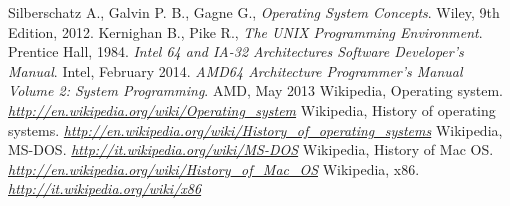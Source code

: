 \documentclass[12pt,a4paper]{report}
\begin{document}
						
\begin{thebibliography}{}
		Silberschatz A., Galvin P. B., Gagne G.,
		\emph{Operating System Concepts}.
		Wiley,
		9th Edition,
		2012.
		Kernighan B., Pike R.,
		\emph{The UNIX Programming Environment}.
		Prentice Hall,
		1984.
		\emph{Intel 64 and IA-32 Architectures Software Developer’s Manual}.
		Intel,
		February 2014.
		\emph{AMD64 Architecture Programmer’s Manual Volume 2: System Programming}.
		AMD,
		May 2013
		Wikipedia, Operating system.
		\emph{\url{http://en.wikipedia.org/wiki/Operating_system}}
		Wikipedia, History of operating systems.
		\emph{\url{http://en.wikipedia.org/wiki/History_of_operating_systems}}
		Wikipedia, MS-DOS.
		\emph{\url{http://it.wikipedia.org/wiki/MS-DOS}}
		Wikipedia, History of Mac OS.
		\emph{\url{http://en.wikipedia.org/wiki/History_of_Mac_OS}}
		Wikipedia, x86.
		\emph{\url{http://it.wikipedia.org/wiki/x86}}
\end{thebibliography}
\end{document}

